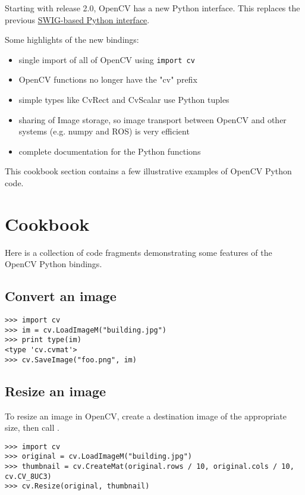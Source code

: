 Starting with release 2.0, OpenCV has a new Python interface. This replaces the previous 
\href{http://opencv.willowgarage.com/wiki/SwigPythonInterface}{SWIG-based Python interface}.

Some highlights of the new bindings:

\begin{itemize}
\item{single import of all of OpenCV using \texttt{import cv}}
\item{OpenCV functions no longer have the "cv" prefix}
\item{simple types like CvRect and CvScalar use Python tuples}
\item{sharing of Image storage, so image transport between OpenCV and other systems (e.g. numpy and ROS) is very efficient}
\item{complete documentation for the Python functions}
\end{itemize}

This cookbook section contains a few illustrative examples of OpenCV Python code.

\section{Cookbook}

Here is a collection of code fragments demonstrating some features
of the OpenCV Python bindings.

\subsection{Convert an image}

\begin{lstlisting}
>>> import cv
>>> im = cv.LoadImageM("building.jpg")
>>> print type(im)
<type 'cv.cvmat'>
>>> cv.SaveImage("foo.png", im)
\end{lstlisting}

\subsection{Resize an image}

To resize an image in OpenCV, create a destination image of the appropriate size, then call .

\begin{lstlisting}
>>> import cv
>>> original = cv.LoadImageM("building.jpg")
>>> thumbnail = cv.CreateMat(original.rows / 10, original.cols / 10, cv.CV_8UC3)
>>> cv.Resize(original, thumbnail)
\end{lstlisting}

